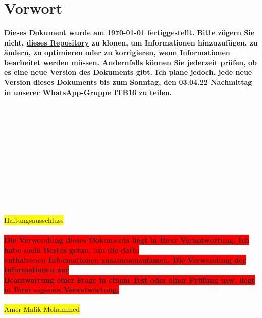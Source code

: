 \documentclass[a4paper]{article}
\begin{document}
    \begin{titlepage}
        
    \end{titlepage}

    

    \section{Vorwort}\label{sec:einführung}
    \paragraph{Dieses Dokument wurde am \today\hspace{0.2cm}\currenttime\hspace{0.2cm} fertiggestellt. Bitte zögern Sie nicht, \href{https://github.com/amermmohammed/LF2_Klausurvorbereitung}{dieses Repository} zu klonen, um Informationen hinzuzufügen, zu ändern, zu optimieren oder zu korrigieren, wenn Informationen bearbeitet werden müssen. Andernfalls können Sie jederzeit prüfen, ob es eine neue Version des Dokuments gibt. Ich plane jedoch, jede neue Version dieses Dokuments bis zum Sonntag, den 03.04.22 Nachmittag in unserer WhatsApp-Gruppe ITB16 zu teilen.}
    \paragraph{\\\\\\\\\\\\\\\\\\\\}
    \begin{center}
        
        \color{red}
        \colorbox{yellow}{Haftungsausschluss}
    \end{center}
    \paragraph{\color{white} \centering\colorbox{red}{Die Verwendung dieses Dokuments liegt in Ihrer Verantwortung. Ich habe mein Bestes getan, um die darin} \\\colorbox{red}{enthaltenen Informationen zusammenzufassen. Die Verwendung der Informationen zur } \\\hspace{1cm}\colorbox{red}{Beantwortung einer Frage in einem Test oder einer Prüfung usw. liegt in Ihrer eigenen Verantwortung.}}
    \begin{center}
        \color{red}
        \colorbox{yellow}{Amer Malik Mohammed}
    \end{center}
    \newpage
    \tableofcontents
    \newpage
    
\end{document}
